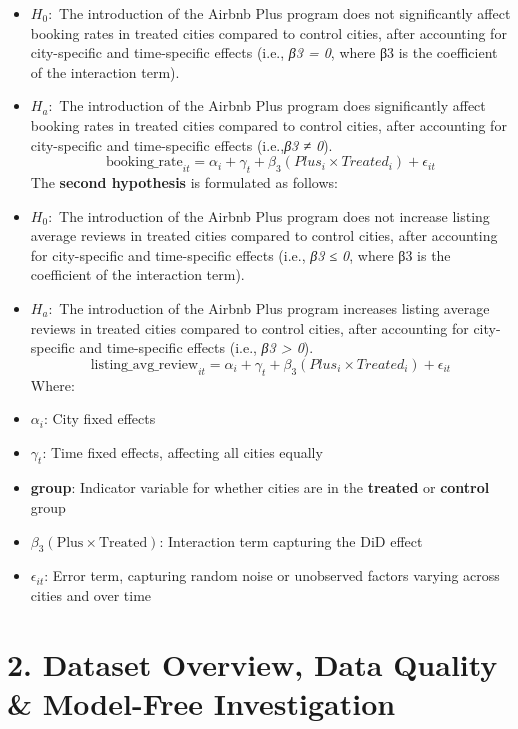 \documentclass[
  12pt,
]{article}
\begin{document}
\begin{itemize}
\item
  \(H_0:\) The introduction of the Airbnb Plus program does not
  significantly affect booking rates in treated cities compared to
  control cities, after accounting for city-specific and time-specific
  effects (i.e., \emph{β3 = 0}, where β3 is the coefficient of the
  interaction term).
\item
  \(H_a:\) The introduction of the Airbnb Plus program does
  significantly affect booking rates in treated cities compared to
  control cities, after accounting for city-specific and time-specific
  effects (i.e.,\emph{β3 ≠ 0}). \[
  \text{booking\_rate}_{it} = \alpha_i + \gamma_t + \beta_3 (Plus_i \times Treated_i) + \epsilon_{it}
  \] The \textbf{second hypothesis} is formulated as follows:
\item
  \(H_0:\) The introduction of the Airbnb Plus program does not increase
  listing average reviews in treated cities compared to control cities,
  after accounting for city-specific and time-specific effects (i.e.,
  \emph{β3 ≤ 0}, where β3 is the coefficient of the interaction term).
\item
  \(H_a:\) The introduction of the Airbnb Plus program increases listing
  average reviews in treated cities compared to control cities, after
  accounting for city-specific and time-specific effects (i.e., \emph{β3
  \textgreater{} 0}). \[
  \text{listing\_avg\_review}_{it} = \alpha_i + \gamma_t + \beta_3 (Plus_i \times Treated_i) + \epsilon_{it}
  \] Where:
\item
  \textbf{\(\alpha_i\)}: City fixed effects
\item
  \textbf{\(\gamma_t\)}: Time fixed effects, affecting all cities
  equally
\item
  \textbf{group}: Indicator variable for whether cities are in the
  \textbf{treated} or \textbf{control} group
\item
  \textbf{\(\beta_3 (\text{Plus} \times \text{Treated})\)}: Interaction
  term capturing the DiD effect
\item
  \(\epsilon_{it}\): Error term, capturing random noise or unobserved
  factors varying across cities and over time
\end{itemize}

\section{2. Dataset Overview, Data Quality \& Model-Free
Investigation}\label{dataset-overview-data-quality-model-free-investigation}
\end{document}
